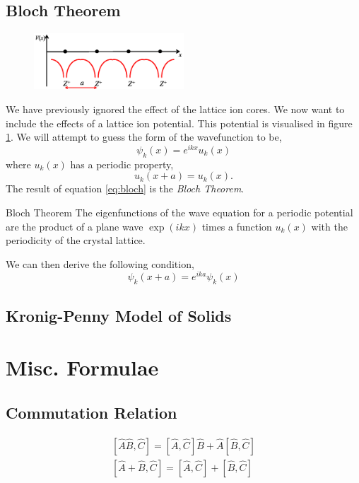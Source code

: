 \documentclass{book}
\begin{document}
\section{Bloch Theorem}
\begin{figure}[h]
	\centering
	\includegraphics[width=0.5\textwidth]{lattice.png}
	\caption{}
	\label{fig:lattice}
\end{figure}
We have previously ignored the effect of the lattice ion cores. We now want to include the effects of a lattice ion potential. This potential is visualised in figure \ref{fig:lattice}. We will attempt to guess the form of the wavefunction to be,
\begin{equation}
	\psi_k(x) = e^{ikx}u_k(x) \label{eq:bloch}
\end{equation}
where $u_k(x)$ has a periodic property,
\begin{equation}
	u_k(x+a) = u_k(x).
\end{equation}
The result of equation \eqref{eq:bloch} is the \textit{Bloch Theorem}.
\begin{Theorems}{Bloch Theorem}
	The eigenfunctions of the wave equation for a periodic potential are the product of a plane wave $\exp(ikx)$ times a function $u_k(x)$ with the periodicity of the crystal lattice. 
\end{Theorems}
We can then derive the following condition,
\begin{equation}
	\psi_k(x + a) = e^{ika}\psi_k(x)
\end{equation}
\section{Kronig-Penny Model of Solids}

\appendix
\chapter{Misc. Formulae}
\section{Commutation Relation}
\begin{align}
	\left[\hat{A}\hat{B}, \hat{C}\right] = \left[\hat{A}, \hat{C}\right]\hat{B} + \hat{A}\left[\hat{B},\hat{C}\right] \\
	\left[\hat{A} + \hat{B}, \hat{C}\right] = \left[\hat{A}, \hat{C}\right] + \left[\hat{B},\hat{C}\right]
\end{align}
\end{document}
